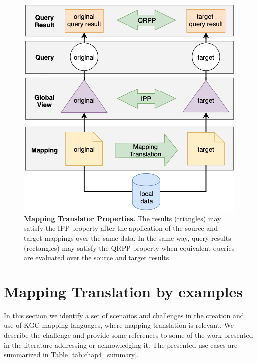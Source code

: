 \begin{figure}[!ht]
    \centering
    \includegraphics[width=0.6\columnwidth]{./figures/mapping-translator.png}
    \caption[Mapping translator properties]{\textbf{Mapping Translator Properties.} The results (triangles) may satisfy the IPP property after the application of the source and target mappings over the same data. In the same way, query results (rectangles) may satisfy the QRPP property when equivalent queries are evaluated over the source and target results.}
    \label{fig:mt}
\end{figure}


\section{Mapping Translation by examples}
In this section we identify a set of scenarios and challenges in the creation and use of KGC mapping languages, where mapping translation is relevant. We describe the challenge and provide some references to some of the work presented in the literature addressing or acknowledging it. The presented use cases are summarized in Table \ref{tab:chap4_summary}.

\begin{table}[h]
\centering
\caption{Summary of mapping translation approaches}
\label{tab:chap4_summary}
\end{table}



